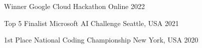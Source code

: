 \documentclass[11pt, a4paper]{awesome-cv}
\begin{document}


\begin{cvhonors}

\cvhonor
    {Winner} %
    {Google Cloud Hackathon} %
    {Online} %
    {2022} %

\cvhonor
    {Top 5 Finalist} %
    {Microsoft AI Challenge} %
    {Seattle, USA} %
    {2021} %

\end{cvhonors}


\begin{cvhonors}

\cvhonor
    {1st Place} %
    {National Coding Championship} %
    {New York, USA} %
    {2020} %

\end{cvhonors}

\end{document}

